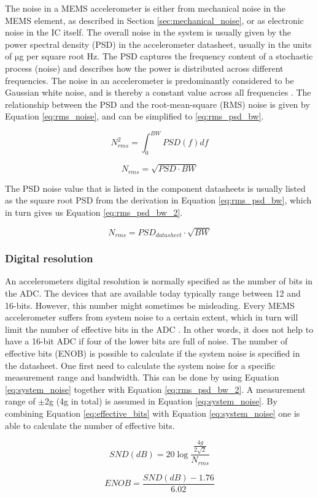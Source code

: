 The noise in a MEMS accelerometer is either from mechanical noise in the MEMS element, as described in Section \ref{sec:mechanical_noise}, or as electronic noise in the IC itself. The overall noise in the system is usually given by the power spectral density (PSD) in the accelerometer datasheet, usually in the units of $\si{\micro}$g per square root Hz. The PSD captures the frequency content of a stochastic process (noise) and describes how the power is distributed across different frequencies. The noise in an accelerometer is predominantly considered to be Gaussian white noise, and is thereby a constant value across all frequencies \cite{freescale_accel_guide}. The relationship between the PSD and the root-mean-square (RMS) noise is given by Equation \ref{eq:rms_noise}, and can be simplified to \ref{eq:rms_psd_bw}.

\begin{equation}
N^{2}_{rms}=\int_0^{BW}{PSD(f)df}
\label{eq:rms_noise}
\end{equation}

\begin{equation}
N_{rms}=\sqrt{PSD \cdot BW}
\label{eq:rms_psd_bw}
\end{equation}

The PSD noise value that is listed in the component datasheets is usually listed as the square root PSD from the derivation in Equation \ref{eq:rms_psd_bw}, which in turn gives us Equation \ref{eq:rms_psd_bw_2}.

\begin{equation}
N_{rms}=PSD_{datasheet} \cdot \sqrt{BW}
\label{eq:rms_psd_bw_2}
\end{equation}

\subsubsection{Digital resolution}

An accelerometers digital resolution is normally specified as the number of bits in the ADC. The devices that are available today typically range between 12 and 16-bits. However, this number might sometimes be misleading. Every MEMS accelerometer suffers from system noise to a certain extent, which in turn will limit the number of effective bits in the ADC \cite[~p.3]{freescale_accel_terminology}. In other words, it does not help to have a 16-bit ADC if four of the lower bits are full of noise. The number of effective bits (ENOB) is possible to calculate if the system noise is specified in the datasheet. One first need to calculate the system noise for a specific measurement range and bandwidth. This can be done by using Equation \ref{eq:system_noise} together with Equation \ref{eq:rms_psd_bw_2}. A measurement range of $\pm$2g (4g in total) is assumed in Equation \ref{eq:system_noise}. By combining Equation \ref{eq:effective_bits} with Equation \ref{eq:system_noise} one is able to calculate the number of effective bits. 

\begin{equation}
SND(dB) = 20\log{\frac{\frac{4g}{2\sqrt{2}}}{N_{rms}}}
\label{eq:system_noise}
\end{equation}

\begin{equation}
ENOB = \frac{SND(dB)-1.76}{6.02}
\label{eq:effective_bits}
\end{equation}